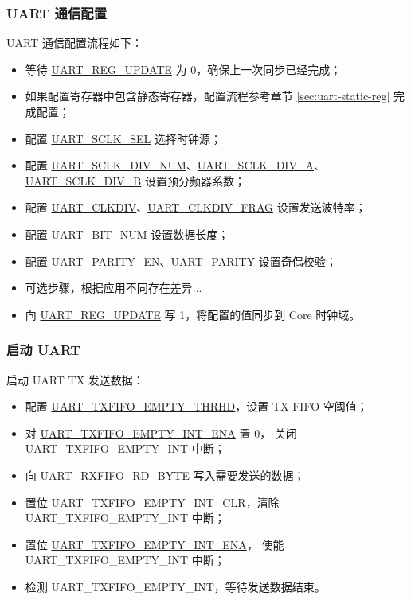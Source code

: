 \documentclass[main\_\_CN.tex]{subfiles}
\begin{document}
\subsubsection{UART 通信配置}

UART 通信配置流程如下：
\begin{itemize}
    \item 等待 \hyperref[fielddesc:UARTREGUPDATE]{UART\_REG\_UPDATE} 为 0，确保上一次同步已经完成；
    \item 如果配置寄存器中包含静态寄存器，配置流程参考章节 \ref{sec:uart-static-reg} 完成配置；
    \item 配置 \hyperref[fielddesc:UARTSCLKSEL]{UART\_SCLK\_SEL} 选择时钟源；
    \item 配置 \hyperref[fielddesc:UARTSCLKDIVNUM]{UART\_SCLK\_DIV\_NUM}、\hyperref[fielddesc:UARTSCLKDIVA]{UART\_SCLK\_DIV\_A}、\hyperref[fielddesc:UARTSCLKDIVB]{UART\_SCLK\_DIV\_B} 设置预分频器系数；
    \item 配置 \hyperref[fielddesc:UARTCLKDIV]{UART\_CLKDIV}、\hyperref[fielddesc:UARTCLKDIVFRAG]{UART\_CLKDIV\_FRAG} 设置发送波特率；
    \item 配置 \hyperref[fielddesc:UARTBITNUM]{UART\_BIT\_NUM} 设置数据长度；
    \item 配置 \hyperref[fielddesc:UARTPARITYEN]{UART\_PARITY\_EN}、\hyperref[fielddesc:UARTPARITY]{UART\_PARITY} 设置奇偶校验；
    \item 可选步骤，根据应用不同存在差异...
    \item 向 \hyperref[fielddesc:UARTREGUPDATE]{UART\_REG\_UPDATE} 写 1，将配置的值同步到 Core 时钟域。
\end{itemize}

\subsubsection{启动 UART}
启动 UART TX 发送数据：
\begin{itemize}
    \item 配置 \hyperref[fielddesc:UARTTXFIFOEMPTYTHRHD]{UART\_TXFIFO\_EMPTY\_THRHD}，设置 TX FIFO 空阈值；
    \item 对 \hyperref[fielddesc:UARTTXFIFOEMPTYINTENA]{UART\_TXFIFO\_EMPTY\_INT\_ENA} 置 0， 关闭 UART\_TXFIFO\_EMPTY\_INT 中断；
    \item 向 \hyperref[fielddesc:UARTRXFIFORDBYTE]{UART\_RXFIFO\_RD\_BYTE} 写入需要发送的数据；
    \item 置位 \hyperref[fielddesc:UARTTXFIFOEMPTYINTCLR]{UART\_TXFIFO\_EMPTY\_INT\_CLR}，清除 UART\_TXFIFO\_EMPTY\_INT 中断；
    \item 置位 \hyperref[fielddesc:UARTTXFIFOEMPTYINTENA]{UART\_TXFIFO\_EMPTY\_INT\_ENA}， 使能 UART\_TXFIFO\_EMPTY\_INT 中断；
    \item 检测 UART\_TXFIFO\_EMPTY\_INT，等待发送数据结束。 
\end{itemize}
\end{document}
